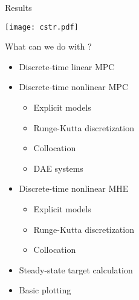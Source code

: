 \documentclass[xcolor=dvipsnames,handout]{beamer}
\begin{document}
\begin{frame}{Results}
    \begin{center}
        \texttt{[image: cstr.pdf]}
    \end{center}
\end{frame}


\begin{frame}{What can we do with \mpctools?}
    \begin{itemize}
        \item Discrete-time linear MPC
        \item Discrete-time nonlinear MPC
        \begin{itemize}
            \item Explicit models
            \item Runge-Kutta discretization
            \item Collocation
            \item DAE systems
        \end{itemize}
        \item Discrete-time nonlinear MHE
        \begin{itemize}
            \item Explicit models
            \item Runge-Kutta discretization
            \item Collocation
        \end{itemize}
        \item Steady-state target calculation
        \item Basic plotting
    \end{itemize}
\end{frame}
\end{document}
